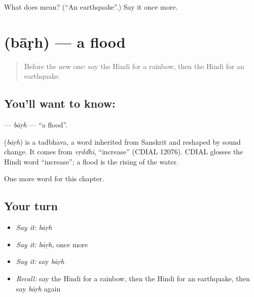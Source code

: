 \begin{tcolorbox}[breakable,colback=teal!4,colframe=teal!35!black,title={Before you move on}]
What does  mean? (\textquotedblleft{}An earthquake\textquotedblright{}.) Say it once more.
\end{tcolorbox}
\section[\texorpdfstring{\hi{बाढ़} (bāṛh)}{बाढ़ (bāṛh)}]{ (bāṛh) — a flood}

\label{lesson:HI-C253-barh}



\begin{quote}
Before the new one: say the Hindi for a rainbow, then the Hindi for an earthquake.
\end{quote}

\subsection*{You'll want to know: }
\textbf{} — \emph{bāṛh} — \textquotedblleft{}a flood\textquotedblright{}.

\begin{cousinweb}
\textbf{} (\emph{bāṛh}) is a tadbhava, a word inherited from Sanskrit and reshaped by sound change. It comes from \emph{vṛddhi}, \textquotedblleft{}increase\textquotedblright{} (CDIAL 12076). CDIAL glosses the Hindi word \textquotedblleft{}increase\textquotedblright{}; a flood is the rising of the water.
\end{cousinweb}

\begin{grammarlens}[title={What you've built}]
One more word for this chapter.
\end{grammarlens}

\subsection*{Your turn}
\begin{itemize}
\raggedright
  \item \emph{Say it:} \emph{bāṛh}
  \item \emph{Say it:} \emph{bāṛh}, once more
  \item \emph{Say it:} say \emph{bāṛh}
  \item \emph{Recall:} say the Hindi for a rainbow, then the Hindi for an earthquake, then say \emph{bāṛh} again
\end{itemize}

